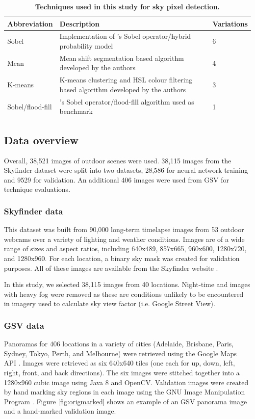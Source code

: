 \documentclass[final,3p,times,authoryear]{elsarticle}
\begin{document}
\begin{table}[!htbp]
\caption{\bf Techniques used in this study for sky pixel detection.  \label{tab:techniques}}     
\begin{tabular}{ l l l}
\textbf{Abbreviation} & \textbf{Description} & \textbf{Variations}  \\ \hline
Sobel  & Implementation of \cite{Wang2015a}'s Sobel operator/hybrid probability model & 6 \\	
Mean &  Mean shift segmentation based algorithm developed by the authors &4 \\
K-means  & K-means clustering and HSL colour filtering based algorithm developed by the authors &3 \\
\hline
Sobel/flood-fill  & \cite{Middel2018}'s Sobel operator/flood-fill algorithm used as benchmark &1 \\
\hline
\end{tabular}
\end{table}


\subsection{Data overview}\label{sec:data}
Overall, 38,521 images of outdoor scenes were used. 38,115 images from the Skyfinder dataset were split into two datasets, 28,586 for neural network training and 9529 for validation. An additional 406 images were used from GSV for technique evaluations.

\subsubsection{Skyfinder data}\label{sec:finderdata}
This dataset was built from 90,000 long-term timelapse images from 53 outdoor webcams over a variety of lighting and weather conditions. Images are of a wide range of sizes and aspect ratios, including 640x489, 857x665, 960x600, 1280x720, and 1280x960. For each location, a binary sky mask was created for validation purposes. All of these images are available from the Skyfinder website \citep{Mihail2015}.

In this study, we selected 38,115 images from 40 locations. Night-time and images with heavy fog were removed as these are conditions unlikely to be encountered in imagery used to calculate sky view factor (i.e. Google Street View).

\subsubsection{GSV data}\label{sec:gsvdata}
Panoramas for 406 locations in a variety of cities (Adelaide, Brisbane, Paris, Sydney, Tokyo, Perth, and Melbourne) were retrieved using the Google Maps API \citep{GoogleMaps2017b}. Images were retrieved as six 640x640 tiles (one each for up, down, left, right, front, and back directions). The six images were stitched together into a 1280x960 cubic image using Java 8 \citep{Oracle2018} and OpenCV\citep {Bradski2000}. Validation images were created by hand marking sky regions in each image using the GNU Image Manipulation Program \citep{GIMP2019}. Figure \ref{fig:origmarked} shows an example of an GSV panorama image and a hand-marked validation image.
\end{document}
